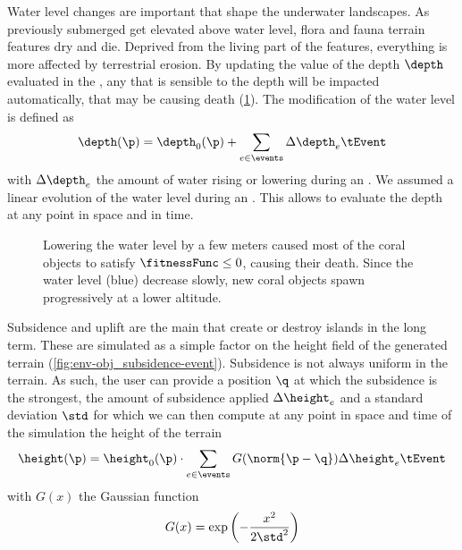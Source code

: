 Water level changes are important  that shape the underwater landscapes. As previously submerged  get elevated above water level, flora and fauna terrain features dry and die. Deprived from the living part of the features, everything is more affected by terrestrial erosion. By updating the value of the depth $\depth$ evaluated in the , any  that is sensible to the depth will be impacted automatically, that may be causing death (\cref{fig:env-obj_water-event}). The modification of the water level is defined as 
\begin{align*}
    \depth(\p) = \depth_0(\p) + \sum_{e \in \events} \Delta \depth_e \tEvent
\end{align*}
with $\Delta \depth_e$ the amount of water rising or lowering during an . We assumed a linear evolution of the water level during an . This allows to evaluate the depth at any point in space and in time.

\begin{figure}
    \caption{Lowering the water level by a few meters caused most of the coral objects to satisfy $\fitnessFunc \leq 0$, causing their death. Since the water level (blue) decrease slowly, new coral objects spawn progressively at a lower altitude.}
    \label{fig:env-obj_water-event}
\end{figure}

Subsidence and uplift are the main  that create or destroy islands in the long term. These  are simulated as a simple factor on the height field of the generated terrain (\cref{fig:env-obj_subsidence-event}). Subsidence is not always uniform in the terrain. As such, the user can provide a position $\q$ at which the subsidence is the strongest, the amount of subsidence applied $\Delta \height_e$ and a standard deviation $\std$ for which we can then compute at any point in space and time of the simulation the height of the terrain
\begin{align*}
    \height(\p) = \height_0(\p) \cdot \sum_{e \in \events}{G(\norm{\p - \q})} \Delta \height_e \tEvent 
\end{align*}
with $G(x)$ the Gaussian function
\begin{align*}
    G(x) = \exp \left(-\frac {x^{2}}{2 \std ^{2}}\right)
\end{align*}

